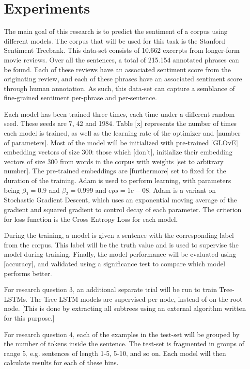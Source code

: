 \section{Experiments}
\label{sec: experiments}
The main goal of this research is to predict the sentiment of a corpus using
different models. The corpus that will be used for this task is the Stanford
Sentiment Treebank\cite{socher2013recursive}. This data-set consists of 10.662
excerpts from longer-form movie reviews. Over all the sentences, a total of
215.154 annotated phrases can be found. Each of these reviews have an associated
sentiment score from the originating review, and each of these phrases have an
associated sentiment score through human annotation. As such, this data-set can 
capture a semblance of fine-grained sentiment per-phrase and per-sentence.

Each model has been trained three times, each time under a different random
seed. These seeds are 7, 42 and 1984. Table [x] represents the number of times
each model is trained, as well as the learning rate of the optimizer and [number
of parameters]. Most of the model will be initialized with pre-trained [GLOvE]
embedding vectors of size 300: those which [don't], initialize their embedding
vectors of size 300 from words in the corpus with weights [set to arbitrary
number]. The pre-trained embeddings are [furthermore] set to fixed for the
duration of the training. Adam\cite{DBLP:journals/corr/KingmaB14} is used to
perform learning, with parameters being $\beta_{1}=0.9$ and $\beta_{2}=0.999$
and $eps=1e-08$. Adam is a variant on Stochastic Gradient Descent, which uses an
exponential moving average of the gradient and squared gradient to control decay
of each parameter. The criterion for loss function is the Cross Entropy Loss for
each model.

During the training, a model is given a sentence with the corresponding label
from the corpus. This label will be the truth value and is used to supervise the
model during training. Finally, the model performance will be evaluated using [accuracy],
and validated using a significance test to compare which model performs better.

For research question 3, an additional separate trial will be run to train
Tree-LSTMs. The Tree-LSTM models are supervised per node, instead of on the root
node. [This is done by extracting all subtrees using an external algorithm
written for this purpose.]

For research question 4, each of the examples in the test-set will be grouped by
the number of tokens inside the sentence. The test-set is fragmented in groups
of range 5, e.g. sentences of length 1-5, 5-10, and so on. Each model will then
calculate results for each of these bins.

